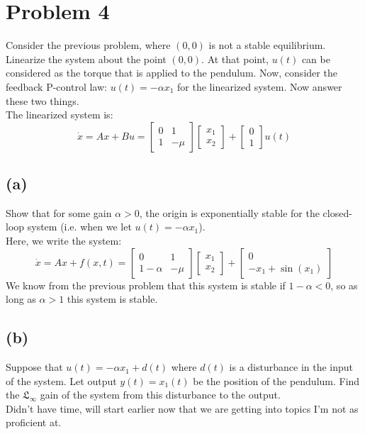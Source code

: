 \documentclass{article}
\begin{document}
\section*{Problem 4}
Consider the previous problem, where $(0,0)$ is not a stable equilibrium. Linearize the system about the point $(0,0)$. At that point, $u(t)$ can be considered as the torque that is applied to the pendulum. Now, consider the feedback P-control law: $u(t)=-\alpha x_1$ for the linearized system. Now answer these two things.\\
The linearized system is:
\[\dot{x}=Ax+Bu=\begin{bmatrix}0 & 1\\1 & -\mu\end{bmatrix}\begin{bmatrix}x_1\\x_2\end{bmatrix}+\begin{bmatrix}0\\1\end{bmatrix}u(t)\]
\subsection*{(a)}
Show that for some gain $\alpha>0$, the origin is exponentially stable for the closed-loop system (i.e. when we let $u(t)=-\alpha x_1$).\\
Here, we write the system:
\[\dot{x}=Ax+f(x,t)=\begin{bmatrix}0 & 1\\1-\alpha &-\mu\end{bmatrix}\begin{bmatrix}x_1\\x_2\end{bmatrix}+\begin{bmatrix}0\\-x_1+\sin(x_1)\end{bmatrix}\]
We know from the previous problem that this system is stable if $1-\alpha<0$, so as long as $\alpha>1$ this system is stable.\\
\subsection*{(b)}
Suppose that $u(t)=-\alpha x_1+d(t)$ where $d(t)$ is a disturbance in the input of the system. Let output $y(t)=x_1(t)$ be the position of the pendulum. Find the $\mathfrak{L}_{\infty}$ gain of the system from this disturbance to the output.\\
Didn't have time, will start earlier now that we are getting into topics I'm not as proficient at.
\end{document}
